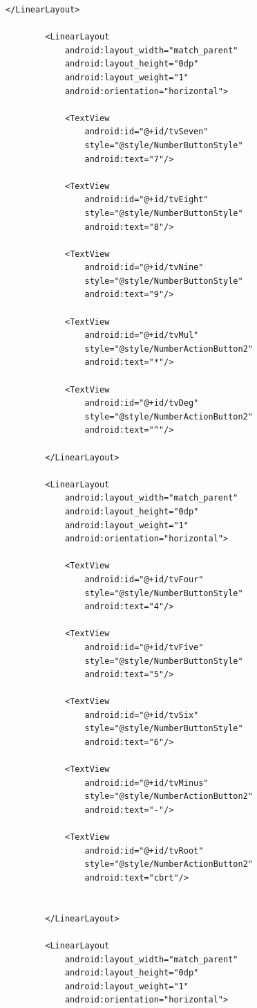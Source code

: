 \documentclass[a4paper, 14pt]{extarticle}
\begin{document}
\begin{lstlisting}[language={},caption={Калькулятор на Kotlin},label={lst:code1}]
        </LinearLayout>

        <LinearLayout
            android:layout_width="match_parent"
            android:layout_height="0dp"
            android:layout_weight="1"
            android:orientation="horizontal">

            <TextView
                android:id="@+id/tvSeven"
                style="@style/NumberButtonStyle"
                android:text="7"/>

            <TextView
                android:id="@+id/tvEight"
                style="@style/NumberButtonStyle"
                android:text="8"/>

            <TextView
                android:id="@+id/tvNine"
                style="@style/NumberButtonStyle"
                android:text="9"/>

            <TextView
                android:id="@+id/tvMul"
                style="@style/NumberActionButton2"
                android:text="*"/>

            <TextView
                android:id="@+id/tvDeg"
                style="@style/NumberActionButton2"
                android:text="^"/>

        </LinearLayout>

        <LinearLayout
            android:layout_width="match_parent"
            android:layout_height="0dp"
            android:layout_weight="1"
            android:orientation="horizontal">

            <TextView
                android:id="@+id/tvFour"
                style="@style/NumberButtonStyle"
                android:text="4"/>

            <TextView
                android:id="@+id/tvFive"
                style="@style/NumberButtonStyle"
                android:text="5"/>

            <TextView
                android:id="@+id/tvSix"
                style="@style/NumberButtonStyle"
                android:text="6"/>

            <TextView
                android:id="@+id/tvMinus"
                style="@style/NumberActionButton2"
                android:text="-"/>

            <TextView
                android:id="@+id/tvRoot"
                style="@style/NumberActionButton2"
                android:text="cbrt"/>


        </LinearLayout>

        <LinearLayout
            android:layout_width="match_parent"
            android:layout_height="0dp"
            android:layout_weight="1"
            android:orientation="horizontal">


\end{lstlisting}
\end{document}
